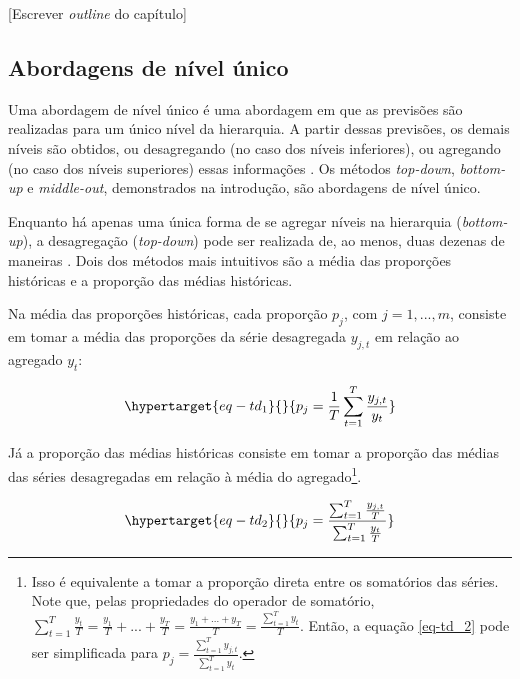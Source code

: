 \documentclass[
  12pt,
  oneside,
  a4paper,
  chapter=TITLE,
  section=TITLE,
  brazil]{abntex2}
\begin{document}
{[}Escrever \emph{outline} do capítulo{]}

\hypertarget{abordagens-de-nuxedvel-uxfanico}{%
\subsection{Abordagens de nível
único}\label{abordagens-de-nuxedvel-uxfanico}}

Uma abordagem de nível único é uma abordagem em que as previsões são
realizadas para um único nível da hierarquia. A partir dessas previsões,
os demais níveis são obtidos, ou desagregando (no caso dos níveis
inferiores), ou agregando (no caso dos níveis superiores) essas
informações \autocite{hyndman_forecasting_2021}. Os métodos
\emph{top-down}, \emph{bottom-up} e \emph{middle-out}, demonstrados na
introdução, são abordagens de nível único.

Enquanto há apenas uma única forma de se agregar níveis na hierarquia
(\emph{bottom-up}), a desagregação (\emph{top-down}) pode ser realizada
de, ao menos, duas dezenas de maneiras
\autocite{gross_disaggregation_1990}. Dois dos métodos mais intuitivos
são a média das proporções históricas e a proporção das médias
históricas.

Na média das proporções históricas, cada proporção \(p_j\), com
\(j = {1,...,m}\), consiste em tomar a média das proporções da série
desagregada \(y_{j,t}\) em relação ao agregado \(y_t\):

\begin{equation}\protect\hypertarget{eq-td_1}{}{
p_j = \frac{1}{T} \sum^{T}_{t=1} \frac{y_{j,t}}{y_t}
}\label{eq-td_1}\end{equation}

Já a proporção das médias históricas consiste em tomar a proporção das
médias das séries desagregadas em relação à média do
agregado\footnote{Isso é equivalente a tomar a proporção direta entre os
  somatórios das séries. Note que, pelas propriedades do operador de
  somatório,
  \(\sum^{T}_{t=1} \frac{y_{t}}{T} = \frac{y_1}{T}+...+\frac{y_T}{T} = \frac{y_1+...+y_T}{T} = \frac{\sum^{T}_{t=1} y_t}{T}\).
  Então, a equação \ref{eq-td_2} pode ser simplificada para
  \(p_j = \frac{\sum^{T}_{t=1} y_{j,t}}{\sum^{T}_{t=1} y_t}\).}.

\begin{equation}\protect\hypertarget{eq-td_2}{}{
p_j = \frac{\sum^{T}_{t=1} \frac{y_{j,t}}{T}}{\sum^{T}_{t=1} \frac{y_{t}}{T}}
}\label{eq-td_2}\end{equation}
\end{document}
